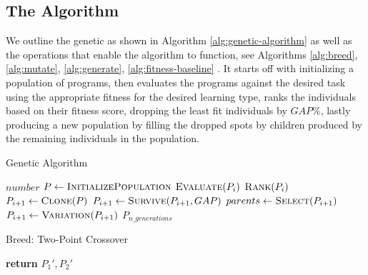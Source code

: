 \documentclass[12pt, final]{dalcsthesis}
\begin{document}
\subsection{The Algorithm}

We outline the genetic as shown in Algorithm \ref{alg:genetic-algorithm}
as well as the operations that enable the algorithm to function, see Algorithms \ref{alg:breed}, \ref{alg:mutate}, \ref{alg:generate}, \ref{alg:fitness-baseline} . It starts off with initializing a population of programs, then evaluates the programs against the desired task using the appropriate fitness for the desired learning type, ranks the individuals based on their fitness score,
dropping the least fit individuals by $GAP\%$, lastly producing a new population by filling the
dropped spots by children produced by the remaining individuals in the population.

\begin{algorithm}[hb]
	\caption{Genetic Algorithm}
	\label{alg:genetic-algorithm}
	\begin{algorithmic}[1]
		\Require $number$
		\State $P \gets \Call{InitializePopulation}{}$
		\State $\Call{Evaluate}{P_{i}}$
		\State $\Call{Rank}{P_{i}}$
		\State $P_{i+1} \gets \Call{Clone}{P}$
		\State $P_{i+1} \gets \Call{Survive}{P_{i+1}, GAP}$
		\State $parents \gets \Call{Select}{P_{i+1}}$
		\State $P_{i+1} \gets \Call{Variation}{P_{i+1}}$
		\EndFor
		\State \Return $P_{n\_generations}$
		\EndProcedure
	\end{algorithmic}
\end{algorithm}

\begin{algorithm}[hb]
	\caption{Breed: Two-Point Crossover}
	\label{alg:breed}
	\begin{algorithmic}[1]
		\State \textbf{return} $P_1', P_2'$
		\EndProcedure
	\end{algorithmic}
\end{algorithm}
\end{document}

